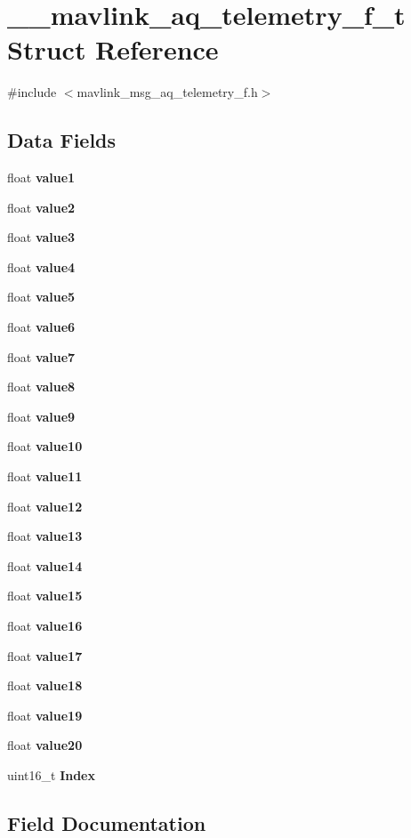 \section{\+\_\+\+\_\+mavlink\+\_\+aq\+\_\+telemetry\+\_\+f\+\_\+t Struct Reference}
\label{struct____mavlink__aq__telemetry__f__t}


{\ttfamily \#include $<$mavlink\+\_\+msg\+\_\+aq\+\_\+telemetry\+\_\+f.\+h$>$}

\subsection*{Data Fields}
\begin{DoxyCompactItemize}
\item 
float \textbf{ value1}
\item 
float \textbf{ value2}
\item 
float \textbf{ value3}
\item 
float \textbf{ value4}
\item 
float \textbf{ value5}
\item 
float \textbf{ value6}
\item 
float \textbf{ value7}
\item 
float \textbf{ value8}
\item 
float \textbf{ value9}
\item 
float \textbf{ value10}
\item 
float \textbf{ value11}
\item 
float \textbf{ value12}
\item 
float \textbf{ value13}
\item 
float \textbf{ value14}
\item 
float \textbf{ value15}
\item 
float \textbf{ value16}
\item 
float \textbf{ value17}
\item 
float \textbf{ value18}
\item 
float \textbf{ value19}
\item 
float \textbf{ value20}
\item 
uint16\+\_\+t \textbf{ Index}
\end{DoxyCompactItemize}


\subsection{Field Documentation}
\mbox{\label{struct____mavlink__aq__telemetry__f__t_a962d8477b52be945ab6bf831aa37de7a}} 
